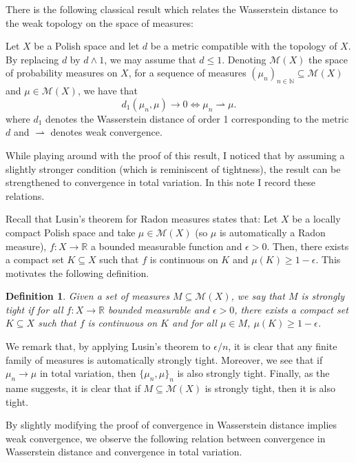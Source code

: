 \documentclass{article}
\newtheorem{definition}{Definition}
\begin{document}
There is the following classical result which relates the Wasserstein distance to the weak
topology on the space of measures:

Let \(X\) be a Polish space and let \(d\) be a metric compatible with the topology of \(X\). By replacing
\(d\) by \(d \wedge 1\), we may assume that \(d \le 1\). Denoting \(\mathcal{M}(X)\) the space of
probability measures on \(X\), for a sequence of measures
\((\mu_n)_{n \in \mathbb{N}} \subseteq \mathcal{M}(X)\) and \(\mu \in \mathcal{M}(X)\), we have that
\begin{equation}\label{eq:wasserstein-weak}
d_1(\mu_n, \mu) \to 0 \iff \mu_n \rightharpoonup \mu.
\end{equation}
where \(d_1\) denotes the Wasserstein distance of order 1 corresponding to the metric \(d\) and
\(\rightharpoonup\) denotes weak convergence.

While playing around with the proof of this result, I noticed that by assuming a slightly stronger condition
(which is reminiscent of tightness), the result can be strengthened to convergence in total variation.
In this note I record these relations.

Recall that Lusin's theorem for Radon measures states that: Let \(X\) be a locally compact Polish space
and take \(\mu \in \mathcal{M}(X)\) (so \(\mu\) is automatically a Radon measure), \(f : X \to \mathbb{R}\)
a bounded measurable function and \(\epsilon > 0\). Then, there exists a compact set \(K \subseteq X\)
such that \(f\) is continuous on \(K\) and \(\mu(K) \ge 1 - \epsilon\). This motivates the following definition.

\begin{definition}
Given a set of measures \(M \subseteq \mathcal{M}(X)\), we say that \(M\) is strongly tight if for all
\(f : X \to \mathbb{R}\) bounded measurable and \(\epsilon > 0\), there exists a compact set \(K \subseteq X\)
such that \(f\) is continuous on \(K\) and for all \(\mu \in M\), \(\mu(K) \ge 1 - \epsilon\).
\end{definition}

We remark that, by applying Lusin's theorem to \(\epsilon / n\), it is clear that any finite family of measures
is automatically strongly tight. Moreover, we see that if \(\mu_n \to \mu\) in total variation, then
\(\{\mu_n, \mu\}_n\) is also strongly tight. Finally, as the name suggests, it is clear that if
\(M \subseteq \mathcal{M}(X)\) is strongly tight, then it is also tight.

By slightly modifying the proof of convergence in Wasserstein distance implies weak convergence, we observe the following
relation between convergence in Wasserstein distance and convergence in total variation.
\end{document}
